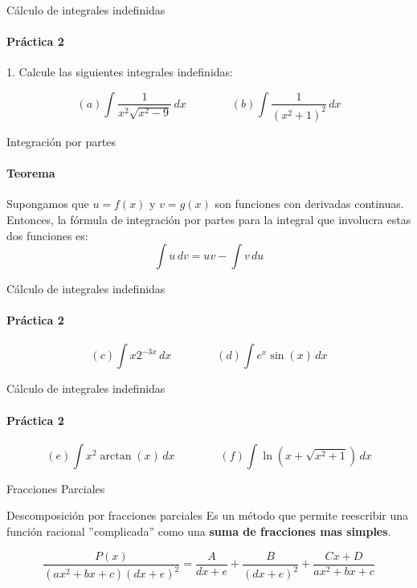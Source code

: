 \documentclass{plantillaPPT}
\begin{document}
\primeraDiapo

\begin{frame}{Cálculo de integrales indefinidas}
\framesubtitle{Práctica 2}

1. Calcule las siguientes integrales indefinidas:

\[(a) \int \frac{1}{x^2\sqrt{x^2-9}}\,dx \qquad \qquad (b) \int \frac{1}{(x^2+1)^2}\,dx\]
    
\end{frame}

\begin{frame}{Integración por partes}
\framesubtitle{Teorema}
\begin{teorema}
    Supongamos que \(u=f(x)\) y \(v=g(x)\) son funciones con derivadas continuas. Entonces, la fórmula de integración por partes para la integral que involucra estas dos funciones es:
    \[\int u\,dv = uv - \int v\,du\]
\end{teorema}

\end{frame}

\begin{frame}{Cálculo de integrales indefinidas}
\framesubtitle{Práctica 2}
\[(c) \int x2^{-3x}\,dx\qquad \qquad (d) \int e^x\sin(x)\,dx\]

\end{frame}

\begin{frame}{Cálculo de integrales indefinidas}
\framesubtitle{Práctica 2}
\[(e) \int x^2\arctan(x)\,dx \qquad \qquad (f) \int \ln(x+\sqrt{x^2+1})\,dx\]

\end{frame}

\begin{frame}[plain]
    \centering
    \vfill
    {\Huge Fracciones Parciales}
    \vfill
\end{frame}

\begin{frame}{Descomposición por fracciones parciales}
Es un método que permite reescribir una función racional ''complicada'' como una \textbf{suma de fracciones mas simples}.

\[
\frac{P(x)}{(ax^2+bx+c)(dx+e)^2}=\frac{A}{dx+e}+\frac{B}{(dx+e)^2}+\frac{Cx+D}{ax^2+bx+c}
\]
    
\end{frame}
\end{document}
